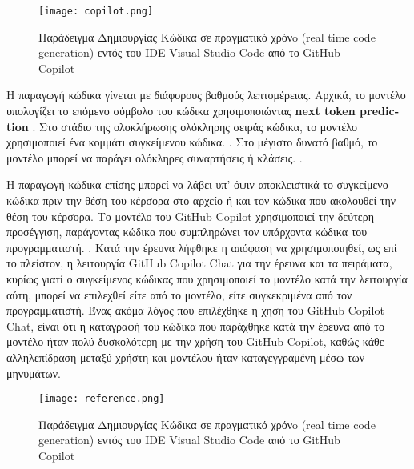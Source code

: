 \begin{figure}[H]
  \begin{center}
    \texttt{[image: copilot.png]}
    \label{fig:codeGen}
    \caption{Παράδειγμα Δημιουργίας Κώδικα σε πραγματικό χρόνo
      \textlatin{(real time code generation)} εντός του \textlatin{IDE}
      \textlatin{Visual Studio Code} από το \textlatin{GitHub Copilot }
    }
  \end{center}
\end{figure}

H παραγωγή κώδικα γίνεται με διάφορους βαθμούς λεπτομέρειας. Αρχικά, το
μοντέλο υπολογίζει το επόμενο σύμβολο του κώδικα χρησιμοποιώντας
\textlatin{\textbf{next token prediction}}
\cite{Izadi2022,Kim2021,Wang2021,Feng2020,Ciniselli2021b,Ciniselli2021a}.
Στο στάδιο της ολοκλήρωσης ολόκληρης σειράς κώδικα, το μοντέλο
χρησιμοποιεί ένα κομμάτι συγκείμενου κώδικα.
\cite{Izadi2022,Guo2022,Svyatkovskiy2020,Lu2021}. Στο μέγιστο δυνατό
βαθμό, το μοντέλο μπορεί να παράγει ολόκληρες συναρτήσεις ή κλάσεις.
\cite{fried2023incoder,Guo2022,githubcopilot}.

Η παραγωγή κώδικα επίσης μπορεί να λάβει υπ' όψιν αποκλειστικά το
συγκείμενο κώδικα πριν την θέση του κέρσορα στο αρχείο ή και τον κώδικα
που ακολουθεί την θέση του κέρσορα. \cite{izadi2024language} Το μοντέλο
του \textlatin{GitHub Copilot} χρησιμοποιεί την δεύτερη προσέγγιση,
παράγοντας κώδικα που συμπληρώνει τον υπάρχοντα κώδικα του
προγραμματιστή. \cite{githubcopilot,fried2023incoder, wang2021codet5}.
Κατά την έρευνα λήφθηκε η απόφαση να χρησιμοποιηθεί, ως επί το πλείστον,
η λειτουργία \textlatin{GitHub Copilot Chat} για την έρευνα και τα
πειράματα, κυρίως γιατί ο συγκείμενος κώδικας που χρησιμοποιεί το
μοντέλο κατά την λειτουργία αύτη, μπορεί να επιλεχθεί είτε από το
μοντέλο, είτε συγκεκριμένα από τον προγραμματιστή. Ένας ακόμα λόγος που
επιλέχθηκε η χηση του \textlatin{GitHub Copilot Chat}, είναι ότι η
καταγραφή του κώδικα που παράχθηκε κατά την έρευνα από το μοντέλο ήταν
πολύ δυσκολότερη με την χρήση του \textlatin{GitHub Copilot}, καθώς κάθε
αλληλεπίδραση μεταξύ χρήστη και μοντέλου ήταν καταγεγγραμένη μέσω των μηνυμάτων.

\begin{figure}[H]
  \begin{center}
    \texttt{[image: reference.png]}
    \label{fig:reference}
    \caption{Παράδειγμα Δημιουργίας Κώδικα σε πραγματικό χρόνo
      \textlatin{(real time code generation)} εντός του \textlatin{IDE}
      \textlatin{Visual Studio Code} από το \textlatin{GitHub Copilot }
    }
  \end{center}
\end{figure}

